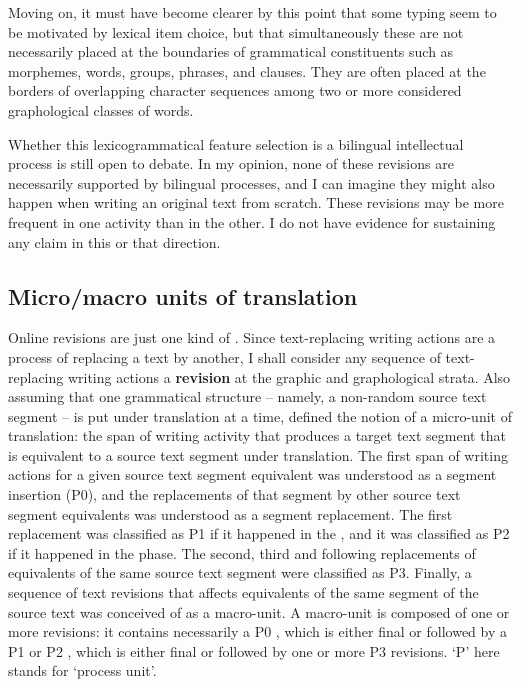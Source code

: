 \documentclass[output=paper]{LSP/langsci}
\begin{document}
Moving on, it must have become clearer by this point that some typing  seem to be motivated by lexical item choice, but that simultaneously these  are not necessarily placed at the boundaries of grammatical constituents such as morphemes, words, groups, phrases, and clauses. They are often placed at the borders of overlapping character sequences among two or more considered graphological classes of words.

Whether this lexicogrammatical feature selection is a bilingual intellectual process is still open to debate. In my opinion, none of these revisions are necessarily supported by bilingual processes, and I can imagine they might also happen when writing an original text from scratch. These revisions may be more frequent in one activity than in the other. I do not have evidence for sustaining any claim in this or that direction.

\subsection{Micro/macro units of translation}
\label{couto:sec:MicroMacro}

Online revisions are just one kind of .  Since text-replacing writing actions are a process of replacing a text by another, I shall consider any sequence of text-replacing writing actions a \textbf{revision} at the graphic and graphological strata. Also assuming that one grammatical structure -- namely, a non-random source text segment -- is put under translation at a time, \citet{Alves:2009js,Alves:2011vj} defined the notion of a micro-unit of translation: the span of writing activity that produces a target text segment that is equivalent to a source text segment under translation.
The first span of writing actions for a given source text segment equivalent was understood as a segment insertion (P0), and the replacements of that segment by other source text segment equivalents was understood as a segment replacement. The first replacement was classified as P1 if it happened in the , and it was classified as P2 if it happened in the  phase. The second, third and following replacements of equivalents of the same source text segment were classified as P3. Finally, a sequence of text revisions that affects equivalents of the same segment of the source text was conceived of as a macro-unit. A macro-unit is composed of one or more revisions: it contains necessarily a P0 , which is either final or followed by a P1 or P2 , which is either final or followed by one or more P3 revisions. `P' here stands for `process unit'.
\end{document}
